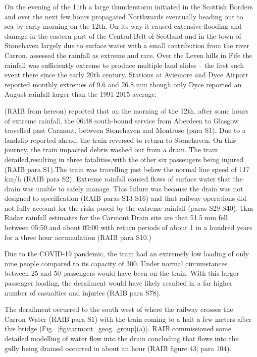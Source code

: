\documentclass[11pt,a4paper]{article}
\begin{document}
On  the evening of the 11th  a large thunderstorm initiated in the Scottish Borders and over the next few hours propagated Northwards eventually heading out to sea by early morning on the 12th\parencite{Kendon2020thunderstrorms_report}. On its way it caused extensive flooding and damage in the eastern part of the Central Belt of Scotland\parencite{SEPA2020report_floods,kendon2021ukclimate} and in the town of Stonehaven largely due to surface water with a small contribution from the river Carron. \cite{SEPA2020report_floods} assessed the rainfall as  extreme and rare. Over the Leven hills in Fife the rainfall was sufficiently extreme to produce multiple land slides -- the first such event there since the early 20th century\parencite{Kirkbride2021}.  Stations at Aviemore and Dyce Airport\parencite{pritchard2020weather} reported monthly extremes of 9.6 and 26.8 mm though only Dyce reported an August rainfall larger than the 1991-2015 average. 



\cite{carmontReport2024} (RAIB from hereon) reported that on the morning of the 12th, after some hours of extreme rainfall, the 06:38 south-bound service from Aberdeen to Glasgow travelled past Carmont, between Stonehaven and Montrose (para S1). Due to a landslip reported ahead, the train reversed to return to Stonehaven. On this journey, the train impacted debris washed out from a drain. The train derailed,resulting in three fatalities,with the other six passengers being injured (RAIB para S1).The train was travelling just below the normal line speed of 117 km/h (RAIB para S2). Extreme rainfall caused flows of surface water that the drain was unable to safely manage. This failure was because the drain was not designed to specification (RAIB paras S13-S16) and that railway operations did not fully account for the risks posed by the extreme rainfall (paras S29-S40). 1km Radar rainfall estimates for the Carmont Drain site are that 51.5 mm fell between 05:50 and about 09:00 with return periods of about 1 in a hundred years for a three hour accumulation (RAIB para S10.)

Due to the COVID-19 pandemic, the train had an extremely low loading of only nine people compared to its capacity of 300. Under normal circumstances between 25 and 50 passengers would have been on the train. With this larger passenger loading, the derailment would have likely resulted in a far higher number of casualties and injuries (RAIB para S78). 

The derailment occurred to the south west of where the railway crosses the Carron Water (RAIB para S1) with the train coming to a halt a few meters after this bridge (Fig.~\ref{fig:carmont_geog_group}(a)).  RAIB commissioned some detailed modelling of water flow into the drain concluding that  flows into the gully being drained occurred in about an hour (RAIB figure 43; para 104). 
\end{document}
